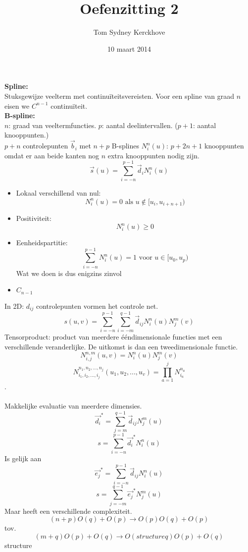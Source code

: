 \documentclass[10pt,a4paper]{article}
\title{Oefenzitting 2}
\author{Tom Sydney Kerckhove}
\date{10 maart 2014}
\begin{document}
\maketitle

\noindent\textbf{Spline:}\\
Stuksgewijze veelterm met continu\"iteitsvereisten. Voor een spline van graad $n$ eisen we $C^{n-1}$ continu\"iteit.\\
\noindent\textbf{B-spline:}\\
$n$: graad van veeltermfuncties. $p$: aantal deelintervallen. ($p+1$: aantal knooppunten.)\\
$p+n$ controlepunten $\vec{b}_i$ met $n+p$ B-splines $N_{i}^{n}(u)$:
$p+2n+1$ knooppunten omdat er aan beide kanten nog $n$ extra knooppunten nodig zijn.
\[
\vec{s}(u) = \sum_{i=-n}^{p-1}\vec{d}_iN_{i}^{n}(u)
\]

\begin{itemize}
\item Lokaal verschillend van nul:
\[
N_{i}^{n}(u) = 0 \text{ als } u \not\in [u_i, u_{i+n+1})
\]

\item Positiviteit:
\[
N_{i}^{n}(u) \ge 0
\]

\item Eenheidspartitie:
\[
\sum_{i=-n}^{p-1}N_{i}^{n}(u) = 1 \text{ voor } u\in [u_0,u_p)
\]
Wat we doen is dus enigzins zinvol

\item $C_{n-1}$

\end{itemize}

In 2D: $d_{ij}$ controlepunten vormen het controle net.
\[
s(u,v) = \sum_{i=-n}^{p-1}\sum_{i=-m}^{q-1}\vec{d}_{ij}N_{i}^{n}(u)N_{j}^{m}(v)
\]
Tensorproduct: product van meerdere \'e\'endimensionale functies met een verschillende veranderlijke. De uitkomst is dan een tweedimensionale functie.
\[
N_{i,j}^{n,m}(u,v) = N_{i}^{n}(u)N_{j}^{m}(v)
\]
\[
N^{n_1,n_2,...,n_j}_{i_1,i_2,...,i_j}(u_1,u_2,...,u_v) = \prod_{a=1}^jN_{i_a}^{n_a}
\]
.\\\\
Makkelijke evaluatie van meerdere dimensies.
\[
\vec{d_i}^* = \sum_{j=m}^{q-1}\vec{d}_{ij}N_{j}^{m}(u)
\]
\[
s = \sum_{i=-n}^{p-1} \vec{d_{i}}^*N_{i}^{n}(u)
\]
Is gelijk aan
\[
\vec{e_j}^* = \sum_{i=-n}^{p-1}\vec{d}_{ij}N_{i}^{n}(u)
\]
\[
s = \sum_{j=-m}^{q-1} \vec{e_{j}}^*N_{j}^{m}(u)
\]
Maar heeft een verschillende complexiteit.
\[
(n+p)O(q) + O(p) \rightarrow O(p)O(q) + O(p)
\]
tov.
\[
(m+q)O(p) + O(q) \rightarrow O(structureq)O(p) + O(q)
\]structure
\end{document}
